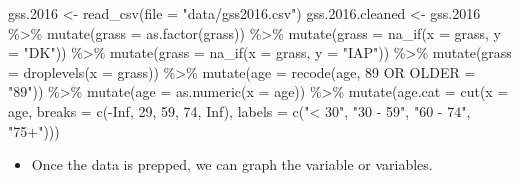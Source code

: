 \documentclass[
  letterpaper,
  DIV=11,
  numbers=noendperiod]{scrreprt}
\newenvironment{Shaded}{\begin{snugshade}}{\end{snugshade}}
\newcommand{\AttributeTok}[1]{\textcolor[rgb]{0.40,0.45,0.13}{#1}}
\newcommand{\ConstantTok}[1]{\textcolor[rgb]{0.56,0.35,0.01}{#1}}
\newcommand{\DecValTok}[1]{\textcolor[rgb]{0.68,0.00,0.00}{#1}}
\newcommand{\FloatTok}[1]{\textcolor[rgb]{0.68,0.00,0.00}{#1}}
\newcommand{\FunctionTok}[1]{\textcolor[rgb]{0.28,0.35,0.67}{#1}}
\newcommand{\NormalTok}[1]{\textcolor[rgb]{0.00,0.23,0.31}{#1}}
\newcommand{\OtherTok}[1]{\textcolor[rgb]{0.00,0.23,0.31}{#1}}
\newcommand{\SpecialCharTok}[1]{\textcolor[rgb]{0.37,0.37,0.37}{#1}}
\newcommand{\StringTok}[1]{\textcolor[rgb]{0.13,0.47,0.30}{#1}}
\providecommand{\tightlist}{%
  \setlength{\itemsep}{0pt}\setlength{\parskip}{0pt}}\usepackage{longtable,booktabs,array}
\begin{document}
\begin{Shaded}
\begin{Highlighting}[]
\NormalTok{gss}\FloatTok{.2016} \OtherTok{\textless{}{-}} \FunctionTok{read\_csv}\NormalTok{(}\AttributeTok{file =} \StringTok{"data/gss2016.csv"}\NormalTok{)}
\NormalTok{gss.}\FloatTok{2016.}\NormalTok{cleaned }\OtherTok{\textless{}{-}}\NormalTok{ gss}\FloatTok{.2016} \SpecialCharTok{\%\textgreater{}\%}
    \FunctionTok{mutate}\NormalTok{(}\AttributeTok{grass =} \FunctionTok{as.factor}\NormalTok{(grass)) }\SpecialCharTok{\%\textgreater{}\%}
    \FunctionTok{mutate}\NormalTok{(}\AttributeTok{grass =} \FunctionTok{na\_if}\NormalTok{(}\AttributeTok{x =}\NormalTok{ grass, }\AttributeTok{y =} \StringTok{"DK"}\NormalTok{)) }\SpecialCharTok{\%\textgreater{}\%}
    \FunctionTok{mutate}\NormalTok{(}\AttributeTok{grass =} \FunctionTok{na\_if}\NormalTok{(}\AttributeTok{x =}\NormalTok{ grass, }\AttributeTok{y =} \StringTok{"IAP"}\NormalTok{)) }\SpecialCharTok{\%\textgreater{}\%}
    \FunctionTok{mutate}\NormalTok{(}\AttributeTok{grass =} \FunctionTok{droplevels}\NormalTok{(}\AttributeTok{x =}\NormalTok{ grass)) }\SpecialCharTok{\%\textgreater{}\%}
    \FunctionTok{mutate}\NormalTok{(}\AttributeTok{age =} \FunctionTok{recode}\NormalTok{(age, }\StringTok{\textasciigrave{}}\AttributeTok{89 OR OLDER}\StringTok{\textasciigrave{}} \OtherTok{=} \StringTok{"89"}\NormalTok{)) }\SpecialCharTok{\%\textgreater{}\%}
    \FunctionTok{mutate}\NormalTok{(}\AttributeTok{age =} \FunctionTok{as.numeric}\NormalTok{(}\AttributeTok{x =}\NormalTok{ age)) }\SpecialCharTok{\%\textgreater{}\%}
    \FunctionTok{mutate}\NormalTok{(}\AttributeTok{age.cat =} \FunctionTok{cut}\NormalTok{(}\AttributeTok{x =}\NormalTok{ age, }\AttributeTok{breaks =} \FunctionTok{c}\NormalTok{(}\SpecialCharTok{{-}}\ConstantTok{Inf}\NormalTok{, }\DecValTok{29}\NormalTok{, }\DecValTok{59}\NormalTok{, }\DecValTok{74}\NormalTok{, }\ConstantTok{Inf}\NormalTok{), }\AttributeTok{labels =} \FunctionTok{c}\NormalTok{(}\StringTok{"\textless{} 30"}\NormalTok{,}
        \StringTok{"30 {-} 59"}\NormalTok{, }\StringTok{"60 {-} 74"}\NormalTok{, }\StringTok{"75+"}\NormalTok{)))}
\end{Highlighting}
\end{Shaded}

\begin{itemize}
\tightlist
\item
  Once the data is prepped, we can graph the variable or variables.
\end{itemize}
\end{document}
